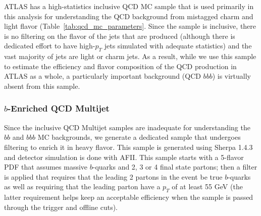ATLAS has a high-statistics inclusive QCD MC sample that is used primarily in 
this analysis for understanding the QCD background from 
mistagged charm and light flavor (Table~\ref{tab:qcd_mc_parameters}.  Since 
the sample is inclusive, there is no filtering on the flavor of the jets 
that are produced (although there is dedicated effort to have high-$p_T$ 
jets simulated with adequate statistics) and the vast majority of jets are light or 
charm jets.  As a result, while we use this sample to estimate the 
efficiency and flavor composition of the QCD production in ATLAS as a whole, a 
particularly important background (QCD $bbb$) is virtually absent from this sample.


\subsubsection{$b$-Enriched QCD Multijet}
\label{sec:bb_qcd_mc}
Since the inclusive QCD Multijet samples are inadequate for understanding the $bb$ and 
$bbb$ MC backgrounds, we generate a dedicated sample that undergoes filtering to 
enrich it in heavy flavor.  This sample is generated using Sherpa 1.4.3 
\cite{Sherpa} and detector simulation is done with AFII.  This sample 
starts with a 5-flavor PDF that assumes massive $b$-quarks and 
2, 3 or 4 final state partons; then a filter is applied that 
requires that the leading 2 partons in the event be true $b$-quarks 
as well as requiring that the leading parton have a $p_T$ 
of at least 55 GeV (the latter requirement helps keep an acceptable efficiency when 
the sample is passed through the trigger and offline cuts).


